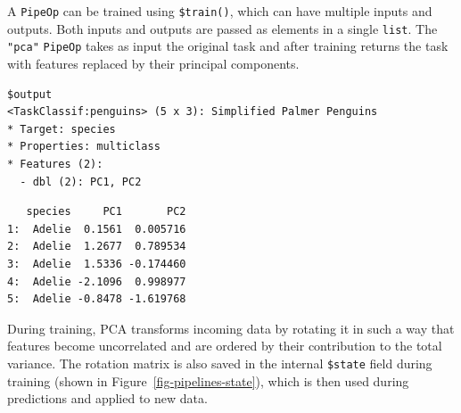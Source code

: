 A \texttt{PipeOp} can be trained using \texttt{\$train()}, which can
have multiple inputs and outputs. Both inputs and outputs are passed as
elements in a single \texttt{list}. The \texttt{"pca"} \texttt{PipeOp}
takes as input the original task and after training returns the task
with features replaced by their principal components.

\begin{Shaded}
\begin{Highlighting}[]
\OtherTok{=} \NormalTok{(}\NormalTok{)}\SpecialCharTok{$}\NormalTok{(}\NormalTok{(}\NormalTok{, }\NormalTok{))}
\OtherTok{=} \SpecialCharTok{$}\NormalTok{()}\SpecialCharTok{$}\NormalTok{(}\SpecialCharTok{:}\NormalTok{))}
\OtherTok{=}\SpecialCharTok{$}
\end{Highlighting}
\end{Shaded}

\begin{verbatim}
$output
<TaskClassif:penguins> (5 x 3): Simplified Palmer Penguins
* Target: species
* Properties: multiclass
* Features (2):
  - dbl (2): PC1, PC2
\end{verbatim}

\begin{Shaded}
\begin{Highlighting}[]
\NormalTok{poout[[}\NormalTok{]]}\SpecialCharTok{$}\NormalTok{()}
\end{Highlighting}
\end{Shaded}

\begin{verbatim}
   species     PC1       PC2
1:  Adelie  0.1561  0.005716
2:  Adelie  1.2677  0.789534
3:  Adelie  1.5336 -0.174460
4:  Adelie -2.1096  0.998977
5:  Adelie -0.8478 -1.619768
\end{verbatim}

During training, PCA transforms incoming data by rotating it in such a
way that features become uncorrelated and are ordered by their
contribution to the total variance. The rotation matrix is also saved in
the internal \texttt{\$state} field during training (shown in
Figure~\ref{fig-pipelines-state}), which is then used during predictions
and applied to new data.

